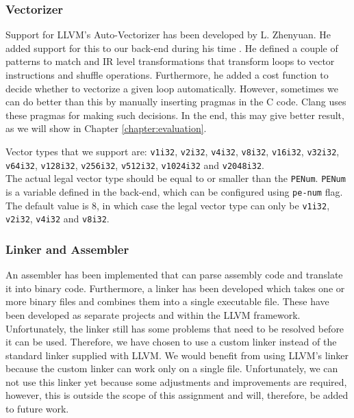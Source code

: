 \subsubsection{Vectorizer}
 Support for LLVM's Auto-Vectorizer has been developed by L. Zhenyuan. He added support for this to our back-end during his time \cite[Chapter~5]{liu_zhenyuan}. He defined a couple of patterns to match and IR level transformations that transform loops to vector instructions and shuffle operations. Furthermore, he added a cost function to decide whether to vectorize a given loop automatically. However, sometimes we can do better than this by manually inserting pragmas in the C code. Clang uses these pragmas for making such decisions. In the end, this may give better result, as we will show in Chapter \ref{chapter:evaluation}.
 
 Vector types that we support are:
 \texttt{v1i32}, \texttt{v2i32}, \texttt{v4i32}, \texttt{v8i32}, \texttt{v16i32}, \texttt{v32i32}, \texttt{v64i32}, \texttt{v128i32}, \texttt{v256i32}, \texttt{v512i32}, \texttt{v1024i32} and \texttt{v2048i32}.\\
	The actual legal vector type should be equal to or smaller than the \texttt{PENum}. \texttt{PENum} is a variable defined in the back-end, which can be configured using \texttt{pe-num} flag. The default value is 8, in which case the legal vector type can only be \texttt{v1i32}, \texttt{v2i32}, \texttt{v4i32} and \texttt{v8i32}.

\subsubsection{Linker and Assembler}
An assembler has been implemented that can parse assembly code and translate it into binary code. Furthermore, a linker has been developed which takes one or more binary files and combines them into a single executable file. These have been developed as separate projects and within the LLVM framework. Unfortunately, the linker still has some problems that need to be resolved before it can be used. %
Therefore, we have chosen to use a custom linker instead of the standard linker supplied with LLVM. We would benefit from using LLVM's linker because the custom linker can work only on a single file. Unfortunately, we can not use this linker yet because some adjustments and improvements are required, however, this is outside the scope of this assignment and will, therefore, be added to future work.


